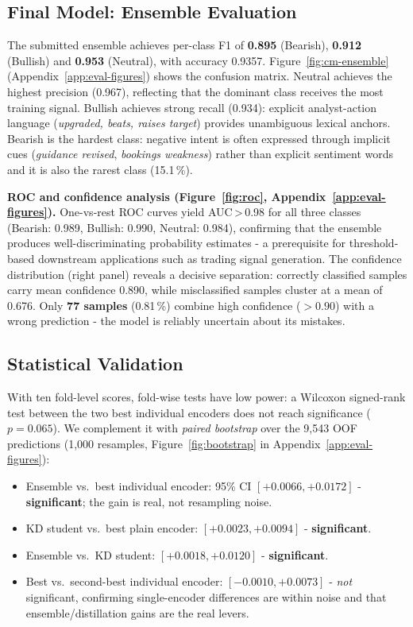 \documentclass[11pt,a4paper]{article}
\newcommand{\ensAcc}{0.9357}
\begin{document}
\subsection{Final Model: Ensemble Evaluation}

The submitted ensemble achieves per-class F1 of
\textbf{0.895} (Bearish), \textbf{0.912} (Bullish) and \textbf{0.953} (Neutral),
with accuracy \ensAcc. Figure~\ref{fig:cm-ensemble} (Appendix~\ref{app:eval-figures}) shows the confusion matrix.
Neutral achieves the highest precision (0.967), reflecting that the dominant class
receives the most training signal. Bullish achieves strong recall (0.934): explicit
analyst-action language (\emph{upgraded, beats, raises target}) provides unambiguous
lexical anchors. Bearish is the hardest class: negative intent is often expressed
through implicit cues (\emph{guidance revised}, \emph{bookings weakness}) rather than
explicit sentiment words and it is also the rarest class (15.1\,\%).

\textbf{ROC and confidence analysis (Figure~\ref{fig:roc}, Appendix~\ref{app:eval-figures}).} One-vs-rest ROC curves yield
AUC\,>\,0.98 for all three classes (Bearish: 0.989, Bullish: 0.990, Neutral: 0.984),
confirming that the ensemble produces well-discriminating probability estimates - a
prerequisite for threshold-based downstream applications such as trading signal generation.
The confidence distribution (right panel) reveals a decisive separation: correctly
classified samples carry mean confidence 0.890, while misclassified samples cluster at
a mean of 0.676. Only \textbf{77 samples} (0.81\,\%) combine high confidence ($>0.90$)
with a wrong prediction - the model is reliably uncertain about its mistakes.

\subsection{Statistical Validation}
\label{sec:stats}
With ten fold-level scores, fold-wise tests have low power: a Wilcoxon signed-rank test
between the two best individual encoders does not reach significance ($p = 0.065$). We
complement it with \emph{paired bootstrap} over the 9{,}543 OOF predictions (1{,}000
resamples, Figure~\ref{fig:bootstrap} in Appendix~\ref{app:eval-figures}):
\begin{itemize}
  \item Ensemble vs.\ best individual encoder: 95\% CI $[{+0.0066},{+0.0172}]$ -
    \textbf{significant}; the gain is real, not resampling noise.
  \item KD student vs.\ best plain encoder: $[{+0.0023},{+0.0094}]$ - \textbf{significant}.
  \item Ensemble vs.\ KD student: $[{+0.0018},{+0.0120}]$ - \textbf{significant}.
  \item Best vs.\ second-best individual encoder: $[-0.0010,{+0.0073}]$ -
    \emph{not} significant, confirming single-encoder differences are within noise and that
    ensemble/distillation gains are the real levers.
\end{itemize}
\end{document}
